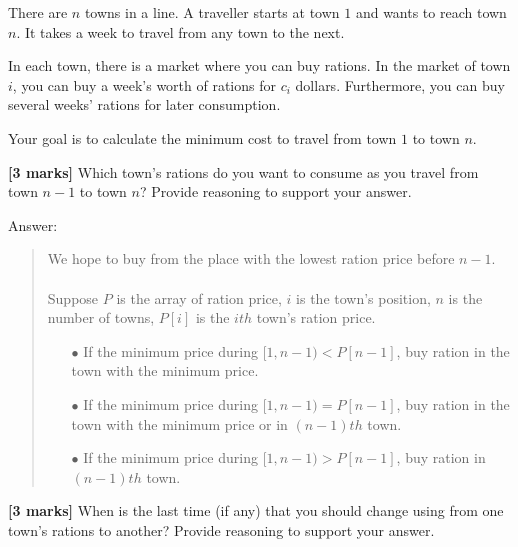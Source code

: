 \documentclass{article}
\begin{document}
\setcounter{question}{1}

\begin{Question}
There are $n$ towns in a line. A traveller starts at town $1$ and wants to reach town $n$. It takes a week to travel from any town to the next.

In each town, there is a market where you can buy rations. In the market of town $i$, you can buy a week's worth of rations for $c_i$ dollars. Furthermore, you can buy several weeks' rations for later consumption.

Your goal is to calculate the minimum cost to travel from town $1$ to town $n$.

\begin{Subquestion}
\textbf{[3 marks]} Which town's rations do you want to consume as you travel from town $n-1$ to town $n$? Provide reasoning to support your answer.

\begin{answer}
Answer:
\begin{quote}
    We hope to buy from the place with the lowest ration price before $n-1$.\\\\
    Suppose $P$ is the array of ration price, $i$ is the town's position, $n$ is the number of towns, $P[i]$ is the $ith$ town's ration price.
    \begin{itemize}
        \item [$\bullet$] If the minimum price during $[1, n - 1) < P[n-1]$, buy ration in the town with the minimum price.
        \item [$\bullet$] If the minimum price during $[1, n - 1) = P[n-1]$, buy ration in the town with the minimum price or in $(n-1)th$ town.
        \item [$\bullet$] If the minimum price during $[1, n - 1) > P[n-1]$, buy ration in $(n-1)th$ town.\\
    \end{itemize}
\end{quote}
\end{answer}
\end{Subquestion}

\begin{Subquestion}
\textbf{[3 marks]} When is the last time (if any) that you should change using from one town's rations to another? Provide reasoning to support your answer.


\end{Subquestion}
\end{Question}
\end{document}

